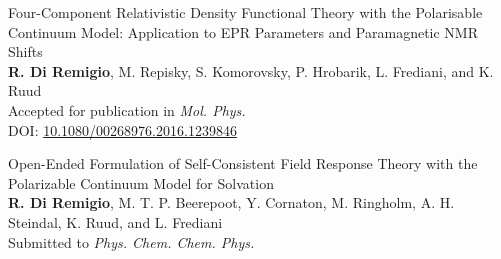 \begin{description}[leftmargin=2mm, style=nextline]
\item[\paper{IV}]
  \small{\textsf{
  Four-Component Relativistic Density Functional Theory with the
  Polarisable Continuum Model: Application to EPR Parameters
  and Paramagnetic NMR Shifts
  }
  \\
  \textbf{R. Di Remigio}, M. Repisky, S. Komorovsky, P. Hrobarik, L.
  Frediani, and K. Ruud
  \\
  Accepted for publication in \textit{Mol. Phys.}
  \\
  DOI: \href{http://dx.doi.org/10.1080/00268976.2016.1239846}{10.1080/00268976.2016.1239846}
  }
\label{pcmepr}

\item[\paper{V}]
  {\small\textsf{
  Open-Ended Formulation of Self-Consistent Field Response Theory with
  the Polarizable Continuum Model for Solvation
  }
  \\
  \textbf{R. Di Remigio}, M. T. P. Beerepoot, Y. Cornaton, M. Ringholm,
  A. H. Steindal, K. Ruud, and L. Frediani
  \\
  Submitted to \textit{Phys. Chem. Chem. Phys.}
  }
\label{pcmopenrsp}
\end{description}
\renewcommand{\descriptionlabel}[1]{\hspace*{\labelsep}\spacedlowsmallcaps{#1}}

